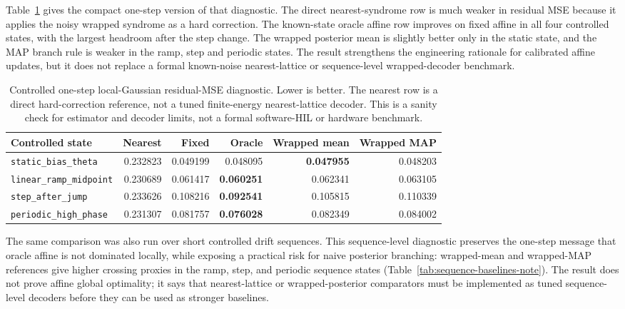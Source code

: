 \documentclass[11pt]{article}
\begin{document}
Table~\ref{tab:controlled-baselines-note} gives the compact one-step version of
that diagnostic.  The direct nearest-syndrome row is much weaker in residual
MSE because it applies the noisy wrapped syndrome as a hard correction.  The
known-state oracle affine row improves on fixed affine in all four controlled
states, with the largest headroom after the step change.  The wrapped posterior
mean is slightly better only in the static state, and the MAP branch rule is
weaker in the ramp, step and periodic states.  The result strengthens the
engineering rationale for calibrated affine updates, but it does not replace a
formal known-noise nearest-lattice or sequence-level wrapped-decoder benchmark.

\begin{table}[ht]
\centering
\scriptsize
\begin{tabular}{lrrrrr}
\toprule
Controlled state & Nearest & Fixed & Oracle & Wrapped mean & Wrapped MAP \\
\midrule
\texttt{static\_bias\_theta} & 0.232823 & 0.049199 & 0.048095 & \textbf{0.047955} & 0.048203 \\
\texttt{linear\_ramp\_midpoint} & 0.230689 & 0.061417 & \textbf{0.060251} & 0.062341 & 0.063105 \\
\texttt{step\_after\_jump} & 0.233626 & 0.108216 & \textbf{0.092541} & 0.105815 & 0.110339 \\
\texttt{periodic\_high\_phase} & 0.231307 & 0.081757 & \textbf{0.076028} & 0.082349 & 0.084002 \\
\bottomrule
\end{tabular}
\caption{Controlled one-step local-Gaussian residual-MSE diagnostic.  Lower is
better.  The nearest row is a direct hard-correction reference, not a tuned
finite-energy nearest-lattice decoder.  This is a sanity check for estimator
and decoder limits, not a formal software-HIL or hardware benchmark.}
\label{tab:controlled-baselines-note}
\end{table}

The same comparison was also run over short controlled drift sequences.  This
sequence-level diagnostic preserves the one-step message that oracle affine is
not dominated locally, while exposing a practical risk for naive posterior
branching: wrapped-mean and wrapped-MAP references give higher crossing
proxies in the ramp, step, and periodic sequence states
(Table~\ref{tab:sequence-baselines-note}).  The result does not prove affine
global optimality; it says that nearest-lattice or wrapped-posterior
comparators must be implemented as tuned sequence-level decoders before they
can be used as stronger baselines.
\end{document}
